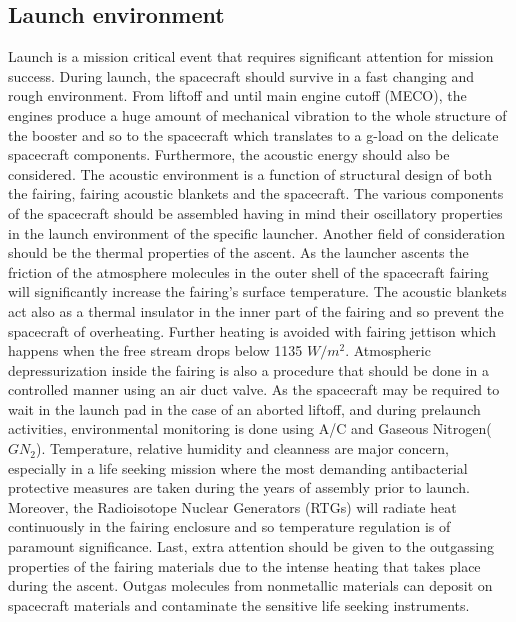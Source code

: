 \subsection{Launch environment}
Launch is a mission critical event that requires significant attention for mission success. During launch, the spacecraft should survive in a fast changing and rough environment. From liftoff and until main engine cutoff (MECO), the engines produce a huge amount of mechanical vibration to the whole structure of the booster and so to the spacecraft which translates to a g-load on the delicate spacecraft components. 
Furthermore, the acoustic energy should also be considered. The acoustic environment is a function of structural design of both the fairing, fairing acoustic blankets and the spacecraft. The various components of the spacecraft should be assembled having in mind their oscillatory properties in the launch environment of the specific launcher. Another field of consideration should be the thermal properties of the ascent. As the launcher ascents the friction of the atmosphere molecules in the outer shell of the spacecraft fairing will significantly increase the fairing’s surface temperature. The acoustic blankets act also as a thermal insulator in the inner part of the fairing and so prevent the spacecraft of overheating. Further heating is avoided with fairing jettison which happens when the free stream drops below 1135 $W/m^2$\cite{Atlasm}.
Atmospheric depressurization inside the fairing is also a procedure that should be done in a controlled manner using an air duct valve. As the spacecraft may be required to wait in the launch pad in the case of an aborted liftoff, and during prelaunch activities, environmental monitoring is done using A/C and Gaseous Nitrogen($GN_2$). Temperature, relative humidity and cleanness are major concern, especially in a life seeking mission where the most demanding antibacterial protective measures are taken during the years of assembly prior to launch. Moreover, the Radioisotope Nuclear Generators (RTGs) will radiate heat continuously in the fairing enclosure and so temperature regulation is of paramount significance. Last, extra attention should be given to the outgassing properties of the fairing materials due to the intense heating that takes place during the ascent. Outgas molecules from nonmetallic materials can deposit on spacecraft materials and contaminate the sensitive life seeking instruments. 

